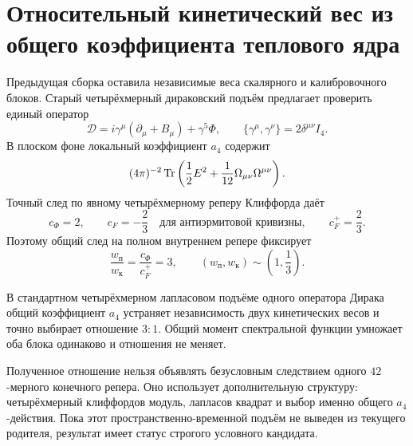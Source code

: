 \chapter{Относительный кинетический вес из общего коэффициента теплового ядра}
\label{ch:v8-full-field-kinetic-relative-weight-parent-origin-gate}

Предыдущая сборка оставила независимые веса скалярного и калибровочного
блоков. Старый четырёхмерный дираковский подъём предлагает проверить единый
оператор
\begin{equation}
 \mathcal D=i\gamma^\mu(\partial_\mu+B_\mu)+\gamma^5\Phi,
 \qquad \{\gamma^\mu,\gamma^\nu\}=2\delta^{\mu\nu}I_4.
 \label{eq:v8-common-dirac-kinetic-lift}
\end{equation}
В плоском фоне локальный коэффициент $a_4$ содержит
\begin{equation}
 (4\pi)^{-2}\operatorname{Tr}\left(\frac12E^2+\frac1{12}\Omega_{\mu\nu}\Omega^{\mu\nu}\right).
 \label{eq:v8-common-a4-kinetic-parent}
\end{equation}
Точный след по явному четырёхмерному реперу Клиффорда даёт
\begin{equation}
 c_{\Phi}=2,
 \qquad c_F=-\frac23
 \quad\text{для антиэрмитовой кривизны},
 \qquad c_F^{+}=\frac23.
 \label{eq:v8-a4-scalar-gauge-coefficients}
\end{equation}
Поэтому общий след на полном внутреннем репере фиксирует
\begin{equation}
 \frac{w_{\text{п}}}{w_{\text{к}}}
 =\frac{c_{\Phi}}{c_F^{+}}=3,
 \qquad (w_{\text{п}},w_{\text{к}})\sim\left(1,\frac13\right).
 \label{eq:v8-a4-relative-kinetic-weight}
\end{equation}

\begin{theorem}
В стандартном четырёхмерном лапласовом подъёме одного оператора Дирака
общий коэффициент $a_4$ устраняет независимость двух кинетических весов и
точно выбирает отношение $3:1$. Общий момент спектральной функции умножает
оба блока одинаково и отношения не меняет.
\end{theorem}

\begin{nogocriterion}
Полученное отношение нельзя объявлять безусловным следствием одного
$42$-мерного конечного репера. Оно использует дополнительную структуру:
четырёхмерный клиффордов модуль, лапласов квадрат и выбор именно общего
$a_4$-действия. Пока этот пространственно-временной подъём не выведен из
текущего родителя, результат имеет статус строгого условного кандидата.
\end{nogocriterion}


